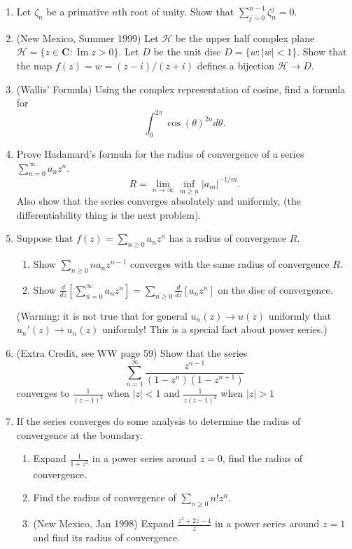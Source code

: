 \documentclass[a4paper,10pt]{article}
\title{}
\author{Dupuy --- Complex Analysis --- Spring 2017 --- Homework 01}
\date{}
\newcommand{\CC}{\mathbf{C}}
\renewcommand{\Im}{\operatorname{Im}}
\begin{document}
\maketitle

\begin{enumerate}
\item Let $\zeta_n$ be a primative $n$th root of unity. Show that $\sum_{j=0}^{n-1} \zeta_n^j=0$.


\item (New Mexico, Summer 1999)
Let $\mathcal{H}$ be the upper half complex plane $\mathcal{H} = \lbrace z \in \CC : \Im z > 0 \rbrace$.
Let $D$ be the unit disc $D = \lbrace w : \vert w \vert < 1 \rbrace$. 
Show that the map $f(z) = w = (z-i)/(z+i)$ defines a bijection $\mathcal{H} \to D$.

\item (Wallis' Formula) Using the complex representation of cosine, find a formula for 
 $$ \int_0^{2\pi} \cos(\theta)^{2n} d\theta. $$


\item Prove Hadamard's formula for the radius of convergence of a series $\sum_{n=0}^{\infty} a_n z^n$.
 $$ R = \lim_{n\to \infty} \inf_{m\geq n} \vert a_m \vert^{-1/m}.$$
Also show that the series converges absolutely and uniformly, (the differentiability thing is the next problem).
 
\item Suppose that $f(z) = \sum_{n\geq0} a_n z^n$ has a radius of convergence $R$. 
\begin{enumerate}
 \item Show $\sum_{n\geq 0} n a_n z^{n-1}$ converges with the same radius of convergence $R$.
 \item Show $\frac{d}{dz}\left[ \sum_{n=0}^{\infty} a_nz^{n}\right] = \sum_{n\geq 0} \frac{d}{dz}[ a_n z^{n}]$ on the disc of convergence.
\end{enumerate}
(Warning: it is not true that for general $u_n(z)\to u(z)$ uniformly that $u_n'(z) \to u_n(z)$ uniformly! This is a special fact about power series.)

\item (Extra Credit, see WW page 59) Show that the series
 $$ \sum_{n =1}^{\infty} \frac{z^{n-1} }{(1-z^n)(1-z^{n+1})}$$
 converges to $\frac{1}{(z-1)^2}$ when $\vert z \vert <1$ and $\frac{1}{z(z-1)^2}$ when $\vert z \vert > 1$


\item 
If the series converges do some analysis to determine the radius of convergence at the boundary.
\begin{enumerate}
\item Expand $\frac{1}{1+z^2}$ in a power series around $z=0$, find the radius of convergence.
\item Find the radius of convergence of $\sum_{n\geq 0} n! z^n$.
\item (New Mexico, Jan 1998) Expand $\frac{z^2+2z-4}{z}$ in a power series around $z=1$ and find its radius of convergence.
\end{enumerate}



\end{enumerate}
\end{document}
